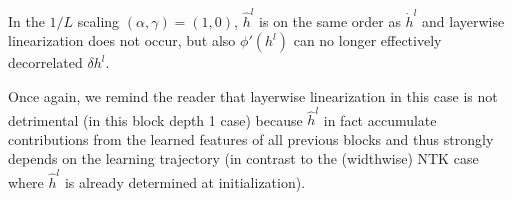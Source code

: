 In the $1/L$ scaling $(\alpha, \gamma) = (1, 0)$, $\hat h^l$ is on the same order as $\dot h^l$ and layerwise linearization does not occur, but also $\phi'(h^l)$ can no longer effectively decorrelated $\delta h^l$.

Once again, we remind the reader that layerwise linearization in this case is not detrimental (in this block depth 1 case) because $\hat h^l$ in fact accumulate contributions from the learned features of all previous blocks and thus strongly depends on the learning trajectory (in contrast to the (widthwise) NTK case where $\hat h^l$ is already determined at initialization).

